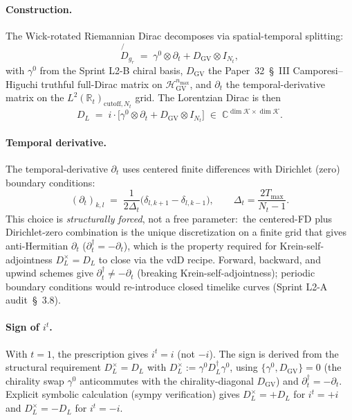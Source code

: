 \documentclass[11pt]{article}
\begin{document}
\paragraph{Construction.}
The Wick-rotated Riemannian Dirac decomposes via spatial-temporal
splitting:
\begin{equation}
\label{eq:l2c_dirac_decomposition}
   \not{\!\!D}_{g_r}
   \;=\; \gamma^0 \otimes \partial_t
     + D_{\mathrm{GV}} \otimes I_{N_t},
\end{equation}
with $\gamma^0$ from the Sprint L2-B chiral basis,
$D_{\mathrm{GV}}$ the Paper~32~\S~III Camporesi--Higuchi truthful
full-Dirac matrix on $\mathcal{H}_{\mathrm{GV}}^{n_{\max}}$, and
$\partial_t$ the temporal-derivative matrix on the $L^2(\mathbb{R}_t)_{\mathrm{cutoff}, N_t}$
grid.  The Lorentzian Dirac is then
\begin{equation}
\label{eq:l2c_lorentzian_dirac}
   D_L \;=\; i \cdot \bigl[ \gamma^0 \otimes \partial_t
     + D_{\mathrm{GV}} \otimes I_{N_t} \bigr]
   \;\in\; \mathbb{C}^{\dim \mathcal{K} \times \dim \mathcal{K}}.
\end{equation}

\paragraph{Temporal derivative.}
The temporal-derivative $\partial_t$ uses centered finite differences
with Dirichlet (zero) boundary conditions:
\begin{equation}
\label{eq:l2c_partial_t}
   (\partial_t)_{k, l}
   \;=\; \frac{1}{2 \Delta_t} \bigl(\delta_{l, k+1} - \delta_{l, k-1}\bigr),
   \qquad \Delta_t = \frac{2 T_{\max}}{N_t - 1}.
\end{equation}
This choice is \emph{structurally forced}, not a free parameter:\ the
centered-FD plus Dirichlet-zero combination is the unique discretization
on a finite grid that gives anti-Hermitian $\partial_t$
($\partial_t^\dagger = -\partial_t$), which is the property required
for Krein-self-adjointness $D_L^\times = D_L$ to close via
the vdD recipe.  Forward, backward, and upwind schemes give
$\partial_t^\dagger \neq -\partial_t$ (breaking Krein-self-adjointness);
periodic boundary conditions would re-introduce closed timelike curves
(Sprint L2-A audit~\S~3.8).

\paragraph{Sign of $i^t$.}
With $t = 1$, the prescription gives $i^t = i$ (not $-i$).  The sign
is derived from the structural requirement $D_L^\times = D_L$ with
$D_L^\times := \gamma^0 D_L^\dagger \gamma^0$, using
$\{\gamma^0, D_{\mathrm{GV}}\} = 0$ (the chirality swap $\gamma^0$
anticommutes with the chirality-diagonal $D_{\mathrm{GV}}$) and
$\partial_t^\dagger = -\partial_t$.  Explicit symbolic calculation
(sympy verification) gives $D_L^\times = +D_L$ for $i^t = +i$ and
$D_L^\times = -D_L$ for $i^t = -i$.
\end{document}
